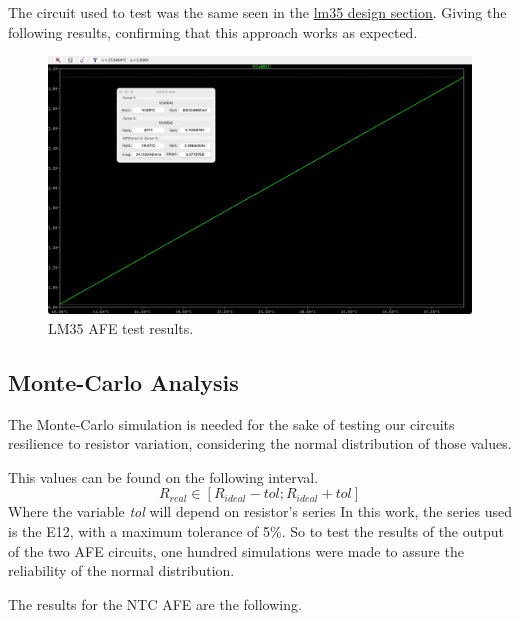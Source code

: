 \documentclass[12pt]{article}
\begin{document}
    The circuit used to test was the same seen in the \hyperref[AFELM35]{lm35 design section}.
    Giving the following results, confirming that this approach works as expected. 
    
    \begin{figure}[H] 
        \centering
        \includegraphics*[scale = 0.15]{images/LM35AFERes.jpeg}
        \caption{LM35 AFE test results.}
        \label{LM35AFERes}
    \end{figure}

\subsection{Monte-Carlo Analysis} 
    
    The Monte-Carlo simulation is needed for the sake of testing our circuits resilience to resistor variation, considering 
    the normal distribution of those values. 

    This values can be found on the following interval.
    \begin{equation}
        R_{real} \in [R_{ideal} - tol; R_{ideal} + tol] 
    \end{equation}
    Where the variable \textit{tol} will depend on resistor's series 
    In this work, the series used is the E12, with a maximum tolerance of 5\%. So to test the results of
    the output of the two AFE circuits, one hundred simulations were made to assure the reliability of the normal distribution.

    The results for the NTC AFE are the following.
\end{document}
